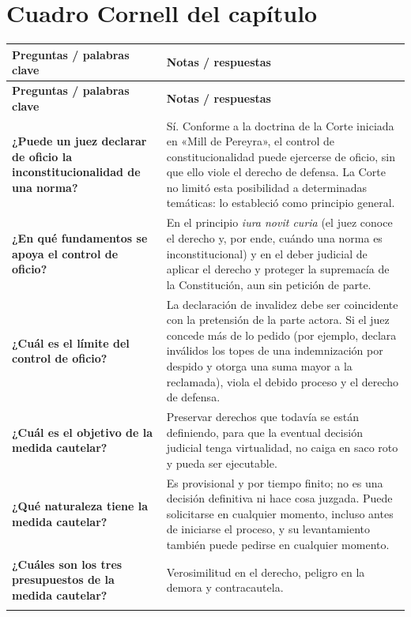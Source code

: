 \documentclass[12pt,oneside]{book}
\newlength{\cornellleft}
\newlength{\cornellright}
\newcommand{\cornellheader}{%
    \toprule
    \rowcolor{blue!8}
    \textbf{Preguntas / palabras clave} & \textbf{Notas / respuestas} \\
    \midrule
}
\newcommand{\cornellsep}{%
    \arrayrulecolor{gray!50}\midrule[0.3pt]\arrayrulecolor{black}%
}
\begin{document}
\section{Cuadro Cornell del capítulo}

\begin{longtable}{
    >{\raggedright\arraybackslash}p{\cornellleft}
    >{\raggedright\arraybackslash}p{\cornellright}
}
\cornellheader
\endfirsthead
\cornellheader
\endhead

\textbf{¿Puede un juez declarar de oficio la inconstitucionalidad de una norma?} &
Sí. Conforme a la doctrina de la Corte iniciada en «Mill de Pereyra», el control de constitucionalidad puede ejercerse de oficio, sin que ello viole el derecho de defensa. La Corte no limitó esta posibilidad a determinadas temáticas: lo estableció como principio general. \\
\cornellsep

\textbf{¿En qué fundamentos se apoya el control de oficio?} &
En el principio \textit{iura novit curia} (el juez conoce el derecho y, por ende, cuándo una norma es inconstitucional) y en el deber judicial de aplicar el derecho y proteger la supremacía de la Constitución, aun sin petición de parte. \\
\cornellsep

\textbf{¿Cuál es el límite del control de oficio?} &
La declaración de invalidez debe ser coincidente con la pretensión de la parte actora. Si el juez concede más de lo pedido (por ejemplo, declara inválidos los topes de una indemnización por despido y otorga una suma mayor a la reclamada), viola el debido proceso y el derecho de defensa. \\
\cornellsep

\textbf{¿Cuál es el objetivo de la medida cautelar?} &
Preservar derechos que todavía se están definiendo, para que la eventual decisión judicial tenga virtualidad, no caiga en saco roto y pueda ser ejecutable. \\
\cornellsep

\textbf{¿Qué naturaleza tiene la medida cautelar?} &
Es provisional y por tiempo finito; no es una decisión definitiva ni hace cosa juzgada. Puede solicitarse en cualquier momento, incluso antes de iniciarse el proceso, y su levantamiento también puede pedirse en cualquier momento. \\
\cornellsep

\textbf{¿Cuáles son los tres presupuestos de la medida cautelar?} &
Verosimilitud en el derecho, peligro en la demora y contracautela. \\
\cornellsep


\end{longtable}
\end{document}
